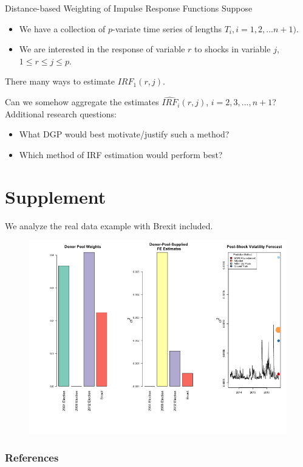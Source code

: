 \documentclass[9pt]{beamer}
\theoremstyle{definition}
\begin{document}
\begin{frame}{Distance-based Weighting of Impulse Response Functions}
    Suppose 
    \begin{itemize}
        \item We have a collection of $p$-variate time series of lengths $T_{i}, i=1,2,...n+1)$.
        \item We are interested in the response of variable $r$ to shocks in variable $j$, $1\leq r \leq j \leq p$. 

    \end{itemize}
    
\bigbreak
There many ways to estimate $IRF_{1}(r,j).$

\bigbreak
Can we somehow aggregate the estimates $\widehat{IRF}_{i}(r,j)$, $i = 2,3,...,n+1$? \\

Additional research questions:
\begin{itemize}
    \item What DGP would best motivate/justify such a method?
    \item Which method of IRF estimation would perform best?

\end{itemize}
\end{frame}
\section{Supplement}
We analyze the real data example with Brexit included.

\begin{figure}[H]
    \begin{center}
      \includegraphics[scale=.32]{real_data_output_plots/savetime_SunMar172251232024_IYG_6B=F-CL=F-^VIX-^IRX-^FVX-^TNX-^TYX_^VIX_2016-11-08-2004-11-02-2008-11-04-2012-11-06-2016-06-22.png}
      \end{center}
    \end{figure}
    

\begin{frame}[t,allowframebreaks]
    \frametitle{References}

\printbibliography[heading=none]
\end{frame}
\end{document}
